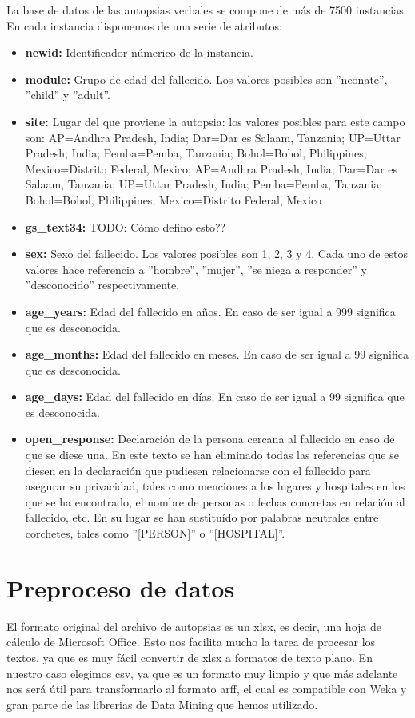 \documentclass[10pt,a4paper,draft]{article}
\begin{document}
La base de datos de las autopsias verbales se compone de más de 7500 instancias. En cada instancia disponemos de una serie de atributos:

\begin{itemize}
\item \textbf{newid:} Identificador númerico de la instancia.
\item \textbf{module:} Grupo de edad del fallecido. Los valores posibles son ''neonate'', ''child'' y ''adult''.
\item \textbf{site:} Lugar del que proviene la autopsia: los valores posibles para este campo son: AP=Andhra Pradesh, India; Dar=Dar es Salaam, Tanzania; UP=Uttar Pradesh, India; Pemba=Pemba, Tanzania; Bohol=Bohol, Philippines; Mexico=Distrito Federal, Mexico; AP=Andhra Pradesh, India; Dar=Dar es Salaam, Tanzania; UP=Uttar Pradesh, India; Pemba=Pemba, Tanzania; Bohol=Bohol, Philippines; Mexico=Distrito Federal, Mexico
\item \textbf{gs\_text34:} TODO: Cómo defino esto??
\item \textbf{sex:} Sexo del fallecido. Los valores posibles son 1, 2, 3 y 4. Cada uno de estos valores hace referencia a ''hombre'', ''mujer'', ''se niega a responder'' y ''desconocido'' respectivamente.
\item \textbf{age\_years:} Edad del fallecido en años. En caso de ser igual a 999 significa que es desconocida.
\item \textbf{age\_months:} Edad del fallecido en meses. En caso de ser igual a 99 significa que es desconocida.
\item \textbf{age\_days:} Edad del fallecido en días. En caso de ser igual a 99 significa que es desconocida.
\item \textbf{open\_response:} Declaración de la persona cercana al fallecido en caso de que se diese una. En este texto se han eliminado todas las referencias que se diesen en la declaración que pudiesen relacionarse con el fallecido para asegurar su privacidad, tales como menciones a los lugares y hospitales en los que se ha encontrado, el nombre de personas o fechas concretas en relación al fallecido, etc. En su lugar se han sustituído por palabras neutrales entre corchetes, tales como ''[PERSON]'' o ''[HOSPITAL]''.
\end{itemize}

\section{Preproceso de datos}
El formato original del archivo de autopsias es un xlsx, es decir, una hoja de cálculo de Microsoft Office. Esto nos facilita mucho la tarea de procesar los textos, ya que es muy fácil convertir de xlsx a formatos de texto plano. En nuestro caso elegimos csv, ya que es un formato muy limpio y que más adelante nos será útil para transformarlo al formato arff, el cual es compatible con Weka y gran parte de las librerias de Data Mining que hemos utilizado.\\
\end{document}
